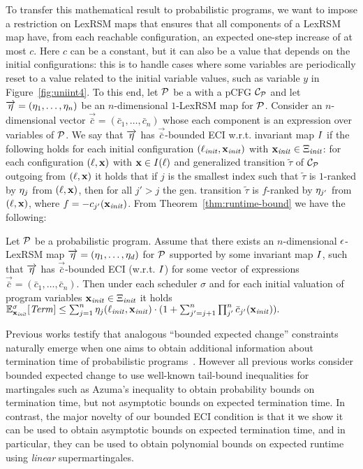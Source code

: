 To transfer this mathematical result to probabilistic programs, we want to 
impose a restriction on LexRSM maps that ensures that all components of a 
LexRSM map have, from each reachable configuration, an expected one-step 
increase of at most $c$. Here $c$ can be a constant, but it can also be a value 
that depends on the initial configurations: this is to handle cases where some 
variables are periodically reset to a value related to the initial variable 
values, such as variable $y$ in Figure~\ref{fig:uniint4}. To this end, let 
$\mathcal{P}$ be a \PP{} with a pCFG $\mathcal{C}_{\mathcal{P}}$ and let 
$\overrightarrow{\eta}=(\eta_1,\dots,\eta_n)$ be an 
$n$-dimensional $1$-LexRSM map for $\mathcal{P}$. Consider an $n$-dimensional 
vector 
$\vec{\bar{c}}=(\bar{c}_1,\dots,\bar{c}_n)$ whose each component is an 
expression over variables of 
$\mathcal{P}$. We say 
that $\overrightarrow{\eta}$ has 
$\vec{\bar{c}}$-bounded ECI w.r.t. invariant map $I$ if the following holds 
for each initial configuration $(\ell_{\mathit{init}},\mathbf{x}_{\mathit{init}})$ with $\mathbf{x}_{\mathit{init}}\in 
\Xi_{\mathit{init}}$: for 
each 
configuration $(\ell,\mathbf{x})$ with $\mathbf{x}\in I(\ell)$ and generalized 
transition $\tilde{\tau}$ 
of 
$\mathcal{C}_{\mathcal{P}}$ outgoing from $(\ell,\mathbf{x})$ it holds that if $j$ is 
the smallest index such that 
$\tilde{\tau}$ is $1$-ranked by $\eta_j$ from $(\ell,\mathbf{x})$, then for all 
$j'>j$ the gen. transition $\tilde{\tau}$ is $f$-ranked by $\eta_{j'}$ from 
$(\ell,\mathbf{x})$, where $f=-c_{j'}(\mathbf{x}_{\mathit{init}})$. From 
Theorem~\ref{thm:runtime-bound} we have the following:

\begin{corollary}
\label{col:runtime-progs}
Let $\mathcal{P}$ be a probabilistic program. Assume that there exists an 
$n$-dimensional $\epsilon$-LexRSM map $\overrightarrow{\eta}=(\eta_1,\dots,\eta_d)$ 
for 
$\mathcal{P}$ supported 
by some 
invariant map $I$, such that $\overrightarrow{\eta}$ has 
$\vec{\bar{c}}$-bounded ECI 
(w.r.t. $I$) 
for some vector of expressions $\vec{\bar{c}}=(\bar{c}_1,\dots,\bar{c}_n)$. 
Then under each scheduler $\sigma$ and for each initial valuation of program 
variables $\mathbf{x}_{\mathit{init}}\in\Xi_{\mathit{init}}$ it holds $\mathbb{E}^{\sigma}_{\mathbf{x}_{\mathit{init}}}[\mathit{Term}]\leq
\sum_{j=1}^{n}\eta_j(\ell_{\mathit{init}},\mathbf{x}_{\mathit{init}})\cdot(1+\sum_{j'= j+1}^{n}\prod_{j'}^{n} 
\bar{c}_{j'}(\mathbf{x}_{\mathit{init}})).$
\end{corollary}

\begin{remark}
Previous works testify that analogous ``bounded expected change'' constraints 
naturally emerge when one aims to obtain additional information about termination 
time of probabilistic programs~\cite{HolgerPOPL,CFNH16:prob-termination,CNZ17}.
However all previous works consider bounded expected change to use well-known 
tail-bound inequalities for martingales such as Azuma's inequality to obtain 
probability bounds on termination time, but not asymptotic bounds on expected
termination time.
In contrast, the major novelty of our bounded ECI condition is that it we show it can be used to 
obtain asymptotic bounds on expected termination time, and in particular, they 
can be used to obtain polynomial bounds on expected runtime using \emph{linear} 
supermartingales.
\end{remark}

